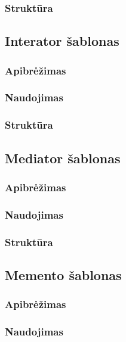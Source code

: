 \documentclass[10pt]{IEEEtran}
\begin{document}
			\subsubsection{Struktūra}

		\subsection{Interator šablonas}

			\subsubsection{Apibrėžimas}

			\subsubsection{Naudojimas}

			\subsubsection{Struktūra}

		\subsection{Mediator šablonas}

			\subsubsection{Apibrėžimas}

			\subsubsection{Naudojimas}

			\subsubsection{Struktūra}

		\subsection{Memento šablonas}

			\subsubsection{Apibrėžimas}

			\subsubsection{Naudojimas}
\end{document}

